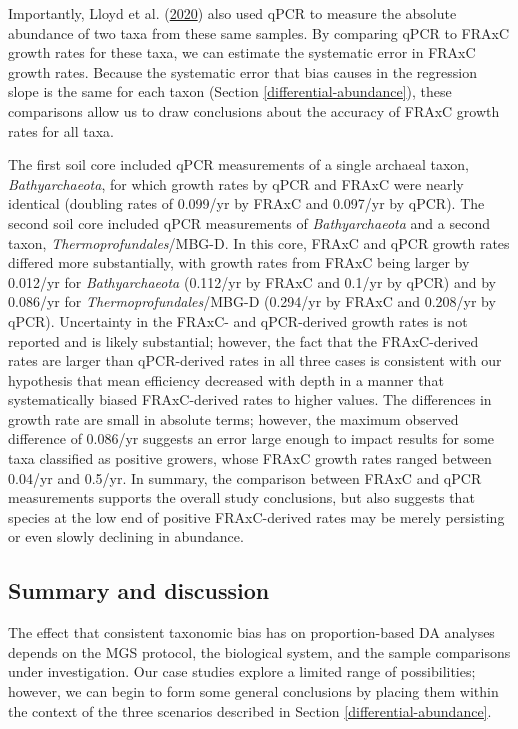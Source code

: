 \documentclass[
]{article}
\begin{document}
Importantly, Lloyd et al. (\protect\hyperlink{ref-lloyd2020evid}{2020}) also used qPCR to measure the absolute abundance of two taxa from these same samples.
By comparing qPCR to FRAxC growth rates for these taxa, we can estimate the systematic error in FRAxC growth rates.
Because the systematic error that bias causes in the regression slope is the same for each taxon (Section \ref{differential-abundance}), these comparisons allow us to draw conclusions about the accuracy of FRAxC growth rates for all taxa.

The first soil core included qPCR measurements of a single archaeal taxon, \emph{Bathyarchaeota}, for which growth rates by qPCR and FRAxC were nearly identical (doubling rates of 0.099/yr by FRAxC and 0.097/yr by qPCR).
The second soil core included qPCR measurements of \emph{Bathyarchaeota} and a second taxon, \emph{Thermoprofundales}/MBG-D.
In this core, FRAxC and qPCR growth rates differed more substantially, with growth rates from FRAxC being larger by 0.012/yr for \emph{Bathyarchaeota} (0.112/yr by FRAxC and 0.1/yr by qPCR) and by 0.086/yr for \emph{Thermoprofundales}/MBG-D (0.294/yr by FRAxC and 0.208/yr by qPCR).
Uncertainty in the FRAxC- and qPCR-derived growth rates is not reported and is likely substantial; however, the fact that the FRAxC-derived rates are larger than qPCR-derived rates in all three cases is consistent with our hypothesis that mean efficiency decreased with depth in a manner that systematically biased FRAxC-derived rates to higher values.
The differences in growth rate are small in absolute terms; however, the maximum observed difference of 0.086/yr suggests an error large enough to impact results for some taxa classified as positive growers, whose FRAxC growth rates ranged between 0.04/yr and 0.5/yr.
In summary, the comparison between FRAxC and qPCR measurements supports the overall study conclusions, but also suggests that species at the low end of positive FRAxC-derived rates may be merely persisting or even slowly declining in abundance.

\hypertarget{summary-and-discussion}{%
\subsection{Summary and discussion}\label{summary-and-discussion}}

The effect that consistent taxonomic bias has on proportion-based DA analyses depends on the MGS protocol, the biological system, and the sample comparisons under investigation.
Our case studies explore a limited range of possibilities; however, we can begin to form some general conclusions by placing them within the context of the three scenarios described in Section \ref{differential-abundance}.
\end{document}
